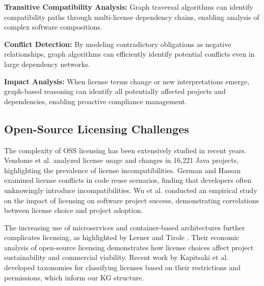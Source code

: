 \documentclass[9pt,twocolumn]{article}
\begin{document}
\textbf{Transitive Compatibility Analysis:} Graph traversal algorithms can identify compatibility paths through multi-license dependency chains, enabling analysis of complex software compositions.

\textbf{Conflict Detection:} By modeling contradictory obligations as negative relationships, graph algorithms can efficiently identify potential conflicts even in large dependency networks.

\textbf{Impact Analysis:} When license terms change or new interpretations emerge, graph-based reasoning can identify all potentially affected projects and dependencies, enabling proactive compliance management.

\subsection{Open-Source Licensing Challenges}
The complexity of OSS licensing has been extensively studied in recent years. Vendome et al. \cite{vendome2017license} analyzed license usage and changes in 16,221 Java projects, highlighting the prevalence of license incompatibilities. German and Hassan \cite{german2009license} examined license conflicts in code reuse scenarios, finding that developers often unknowingly introduce incompatibilities. Wu et al. \cite{wu2017empirical} conducted an empirical study on the impact of licensing on software project success, demonstrating correlations between license choice and project adoption.

The increasing use of microservices and container-based architectures further complicates licensing, as highlighted by Lerner and Tirole \cite{lerner2002simple}. Their economic analysis of open-source licensing demonstrates how license choices affect project sustainability and commercial viability. Recent work by Kapitsaki et al. \cite{kapitsaki2017licenses} developed taxonomies for classifying licenses based on their restrictions and permissions, which inform our KG structure.
\end{document}

